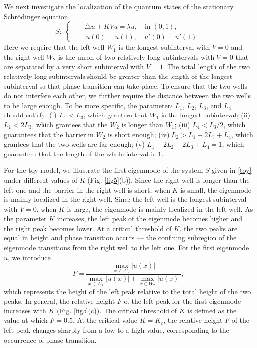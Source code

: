 \documentclass[a4paper,11pt]{article}
\begin{document}
We next investigate the localization of the quantum states of the stationary Schr\"{o}dinger equation
\begin{equation}\label{toy}
S: \;
\left\{
\begin{split}
& -\triangle u + K V u = \lambda u, \quad \textrm{in} \; (0, 1), \\
& \quad u(0) = u(1), \quad u'(0) =  u'(1).
\end{split}
\right.
\end{equation}
Here we require that the left well $W_1$ is the longest subinterval with $V = 0$ and the right well $W_2$ is the union of two relatively long subintervals with $V = 0$ that are separated by a very short subinterval with $V = 1$. The total length of the two relatively long subintervals should be greater than the length of the longest subinterval so that phase transition can take place. To ensure that the two wells do not interfere each other, we further require the distance between the two wells to be large enough. To be more specific, the parameters $L_1$, $L_2$, $L_3$, and $L_4$ should satisfy: (i) $L_1 < L_3$, which grantees that $W_1$ is the longest subinterval; (ii) $L_1 < 2L_3$, which grantees that the $W_2$ is longer than $W_1$; (iii) $L_4 < L_3/2$, which guarantees that the barrier in $W_2$ is short enough; (iv) $L_2 > L_1 + 2L_3 + L_4$, which grantees that the two wells are far enough; (v) $L_1 + 2L_2 + 2 L_3 + L_4 = 1$, which guarantees that the length of the whole interval is $1$.

For the toy model, we illustrate the first eigenmode of the system $S$ given in \eqref{toy} under different values of $K$ (Fig. \ref{fig5}(b)). Since the right well is longer than the left one and the barrier in the right well is short, when $K$ is small, the eigenmode is mainly localized in the right well. Since the left well is the longest subinterval with $V = 0$, when $K$ is large, the eigenmode is mainly localized in the left well. As the parameter $K$ increases, the left peak of the eigenmode becomes higher and the right peak becomes lower. At a critical threshold of $K$, the two peaks are equal in height and phase transition occurs --- the confining subregion of the eigenmode transitions from the right well to the left one. For the first eigenmode $u$, we introduce
\begin{equation}
F = \frac{\max_{x \in W_1} |u(x)|}{\max_{x \in W_1} |u(x)| + \max_{x \in W_2} |u(x)|},
\end{equation}
which represents the height of the left peak relative to the total height of the two peaks. In general, the relative height $F$ of the left peak for the first eigenmode increases with $K$ (Fig. \ref{fig5}(c)). The critical threshold of $K$ is defined as the value at which $F = 0.5$. At the critical value $K = K_c$, the relative height $F$ of the left peak changes sharply from a low to a high value, corresponding to the occurrence of phase transition.
\end{document}
